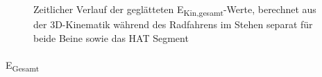 \documentclass[
  letterpaper,
  DIV=11]{scrartcl}
\makeatletter
\let\oldparagraph\paragraph
\renewcommand{\paragraph}{
    \@ifstar
      \xxxParagraphStar
      \xxxParagraphNoStar
  }
\newcommand{\xxxParagraphStar}[1]{\oldparagraph*{#1}\mbox{}}
\newcommand{\xxxParagraphNoStar}[1]{\oldparagraph{#1}\mbox{}}
\makeatother
\begin{document}
\begin{figure}


\caption{\label{fig-PInt_Kinematik_HAT_Ekin_gesamt_stehen}Zeitlicher
Verlauf der geglätteten E\textsubscript{Kin,gesamt}-Werte, berechnet aus
der 3D-Kinematik während des Radfahrens im Stehen separat für beide
Beine sowie das HAT Segment}

\end{figure}%

\paragraph{\texorpdfstring{E\textsubscript{Gesamt}}{EGesamt}}
\end{document}
